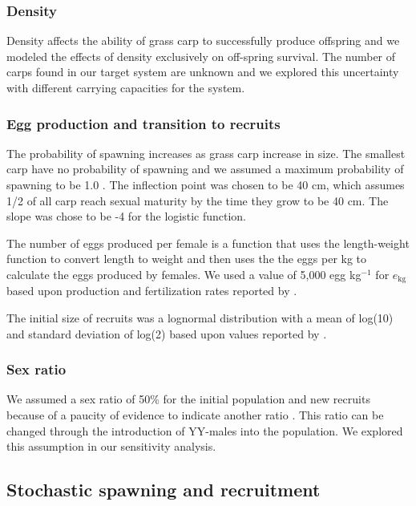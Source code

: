 \documentclass{article}[12pt]
\begin{document}
\subsubsection{Density}

Density affects the ability of grass carp to successfully produce offspring \citep{kilambi1979effects, shelton1981density} and we modeled the effects of density exclusively on off-spring survival. 
The number of carps found in our target system are unknown and we explored this uncertainty with different carrying capacities for the system. 

\subsubsection{Egg production and transition to recruits}

The probability of spawning increases as grass carp increase in size.
The smallest carp have no probability of spawning and we assumed a maximum probability of spawning to be 1.0 \citep{shireman1983synopsis}.
The inflection point was chosen to be 40 cm, which assumes 1/2 of all carp reach sexual maturity by the time they grow to be 40 cm. 
The slope was chose to be -4 for the logistic function. 

The number of eggs produced per female is a function that uses the length-weight function to convert length to weight and then uses the the eggs per kg to calculate the eggs produced by females. 
We used a value of 5,000 egg kg\(^{-1}\) for \(e_\text{kg}\) based upon production and fertilization rates reported by \citet{ashraf1998effects}.

The initial size of recruits was a lognormal distribution with a mean of log(10) and standard deviation of log(2) based upon values reported by \citet{shireman1983synopsis}. 

\subsubsection{Sex ratio}

We assumed a sex ratio of 50\% for the initial population and new recruits because of a paucity of evidence to indicate another ratio \citep{shireman1983synopsis}.
This ratio can be changed through the introduction of YY-males into the population. 
We explored this assumption in our sensitivity analysis. 

\subsection{Stochastic spawning and recruitment}
\end{document}
